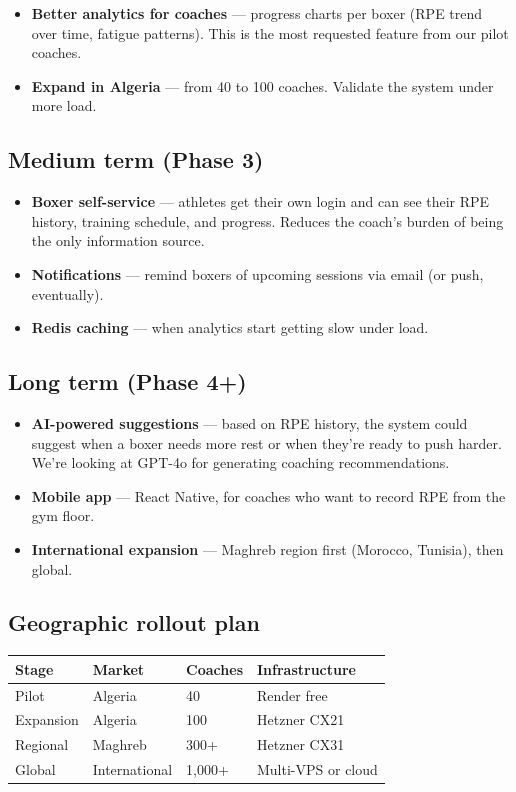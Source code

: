 \documentclass[11pt,a4paper]{article}
\newcommand{\hrow}{\rowcolor{Black}\color{White}\bfseries}
\newcommand{\altrow}{\rowcolor{OffWhite}}
\begin{document}
\begin{itemize}
  \item \textbf{Better analytics for coaches} — progress charts per boxer (RPE trend over time, fatigue patterns). This is the most requested feature from our pilot coaches.
  \item \textbf{Expand in Algeria} — from 40 to 100 coaches. Validate the system under more load.
\end{itemize}

\subsection{Medium term (Phase 3)}

\begin{itemize}
  \item \textbf{Boxer self-service} — athletes get their own login and can see their RPE history, training schedule, and progress. Reduces the coach's burden of being the only information source.
  \item \textbf{Notifications} — remind boxers of upcoming sessions via email (or push, eventually).
  \item \textbf{Redis caching} — when analytics start getting slow under load.
\end{itemize}

\subsection{Long term (Phase 4+)}

\begin{itemize}
  \item \textbf{AI-powered suggestions} — based on RPE history, the system could suggest when a boxer needs more rest or when they're ready to push harder. We're looking at GPT-4o for generating coaching recommendations.
  \item \textbf{Mobile app} — React Native, for coaches who want to record RPE from the gym floor.
  \item \textbf{International expansion} — Maghreb region first (Morocco, Tunisia), then global.
\end{itemize}

\subsection{Geographic rollout plan}

\begin{tabularx}{\linewidth}{L{3.5cm} L{3.5cm} L{3cm} X}
\toprule
\hrow Stage & Market & Coaches & Infrastructure \\
\midrule
Pilot & Algeria & 40 & Render free \\
\altrow Expansion & Algeria & 100 & Hetzner CX21 \\
Regional & Maghreb & 300+ & Hetzner CX31 \\
\altrow Global & International & 1,000+ & Multi-VPS or cloud \\
\bottomrule
\end{tabularx}
\end{document}
